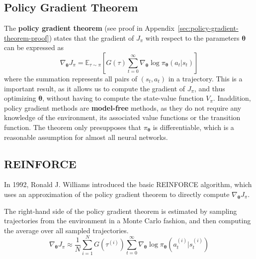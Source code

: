 \documentclass[12pt]{report}
\theoremstyle{definition}
\theoremstyle{remark}
\begin{document}
\subsection{Policy Gradient Theorem}
The \textbf{policy gradient theorem} (see proof in Appendix~\ref{sec:policy-gradient-theorem-proof}) states that the gradient of $J_\pi$ with respect to the parameters $\boldsymbol{\theta}$ can be expressed as
\begin{equation}\label{eq:policy-gradient-theorem}
    \nabla_{\boldsymbol{\theta}} J_\pi =  \mathbb{E}_{\tau\sim\pi}\left[G(\tau) \sum_{t=0}^{\infty} \nabla_{\boldsymbol{\theta}} \log \pi_{\boldsymbol{\theta}}(a_t | s_t)\right]
\end{equation}
where the summation represents all pairs of $(s_t, a_t)$ in a trajectory.
This is a important result, as it allows us to compute the gradient of $J_\pi$, and thus optimizing $\boldsymbol{\theta}$, without having to compute the state-value function $V_\pi$. Inaddition, policy gradient methods are \textbf{model-free} methods, as they do not require any knowledge of the environment, its associated value functions or the transition function. The theorem only presupposes that $\pi_{\boldsymbol{\theta}}$ is differentiable, which is a reasonable assumption for almost all neural networks.

\subsection{\textsc{REINFORCE}}
In 1992, Ronald J. Williams introduced the basic \textsc{REINFORCE} algorithm, which uses an approximation of the policy gradient theorem to directly compute $\nabla_{\boldsymbol{\theta}} J_\pi$.~\cite{williams_simple_1992}

The right-hand side of the policy gradient theorem is estimated by sampling trajectories from the environment in a Monte Carlo fashion, and then computing the average over all sampled trajectories.
\begin{equation}
    \nabla_{\boldsymbol{\theta}} J_\pi \approx \frac{1}{N} \sum_{i=1}^{N} G(\tau^{(i)}) \sum_{t=0}^{\infty} \nabla_{\boldsymbol{\theta}} \log \pi_{\boldsymbol{\theta}}(a_t^{(i)} | s_t^{(i)})
\end{equation}
\end{document}
